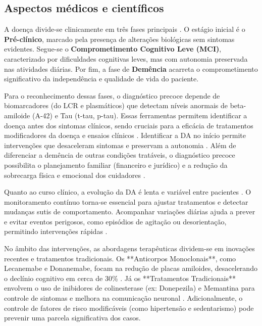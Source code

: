 \documentclass[conference,a4paper,10pt]{IEEETran}
\begin{document}
\subsection{Aspectos médicos e científicos}
A doença divide-se clinicamente em três fases principais \cite{Scheltens2021Alzheimer}. O estágio inicial é o \textbf{Pré-clínico}, marcado pela presença de alterações biológicas sem sintomas evidentes. Segue-se o \textbf{Comprometimento Cognitivo Leve (MCI)}, caracterizado por dificuldades cognitivas leves, mas com autonomia preservada nas atividades diárias. Por fim, a fase de \textbf{Demência} acarreta o comprometimento significativo da independência e qualidade de vida do paciente.

Para o reconhecimento dessas fases, o diagnóstico precoce depende de biomarcadores (do LCR e plasmáticos) que detectam níveis anormais de beta-amiloide (A-42) e Tau (t-tau, p-tau). Essas ferramentas permitem identificar a doença antes dos sintomas clínicos, sendo cruciais para a eficácia de tratamentos modificadores da doença e ensaios clínicos \cite{FDA2023Alzheimers, plasma_biomarkers, Scheltens2021Alzheimer}. Identificar a DA no início permite intervenções que desaceleram sintomas e preservam a autonomia \cite{FDA2023Alzheimers, Scheltens2021Alzheimer}. Além de diferenciar a demência de outras condições tratáveis, o diagnóstico precoce possibilita o planejamento familiar (financeiro e jurídico) e a redução da sobrecarga física e emocional dos cuidadores \cite{BVSMS2023Alzheimer, drew_Alzheimers}.

Quanto ao curso clínico, a evolução da DA é lenta e variável entre pacientes \cite{QiuPredictiveModeling, Sukkar2012Disease}. O monitoramento contínuo torna-se essencial para ajustar tratamentos e detectar mudanças sutis de comportamento. Acompanhar variações diárias ajuda a prever e evitar eventos perigosos, como episódios de agitação ou desorientação, permitindo intervenções rápidas \cite{lv_iCare, ChiarandiniWandering}.

No âmbito das intervenções, as abordagens terapêuticas dividem-se em inovações recentes e tratamentos tradicionais. Os **Anticorpos Monoclonais**, como Lecanemabe e Donanemabe, focam na redução de placas amiloides, desacelerando o declínio cognitivo em cerca de 30\% \cite{FDA2023Alzheimers, Makin2025Dementia}. Já os **Tratamentos Tradicionais** envolvem o uso de inibidores de colinesterase (ex: Donepezila) e Memantina para controle de sintomas e melhora na comunicação neuronal \cite{Scheltens2021Alzheimer}. Adicionalmente, o controle de fatores de risco modificáveis (como hipertensão e sedentarismo) pode prevenir uma parcela significativa dos casos.
\end{document}
